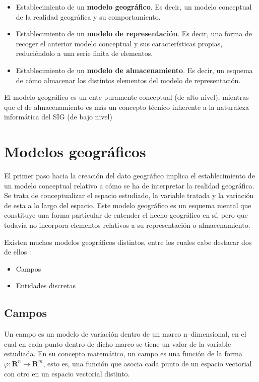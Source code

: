 \begin{multicols}{2}
\begin{itemize}
 \item Establecimiento de un \textbf{modelo geográfico}. Es decir, un modelo conceptual de la realidad geográfica y su comportamiento.
\item Establecimiento de un \textbf{modelo de representación}. Es decir, una forma de recoger el anterior modelo conceptual y sus características propias, reduciéndolo a una serie finita de elementos.
\item Establecimiento de un \textbf{modelo de almacenamiento}. Es decir, un esquema de cómo almacenar los distintos elementos del modelo de representación.
\end{itemize}
El modelo geográfico es un ente puramente conceptual (de alto nivel), mientras que el de almacenamiento es más un concepto técnico inherente a la naturaleza informática del SIG (de bajo nivel)

\section{Modelos geográficos}

El primer paso hacia la creación del dato geográfico implica el establecimiento de un modelo conceptual relativo a cómo se ha de interpretar la realidad geográfica. Se trata de conceptualizar el espacio estudiado, la variable tratada y la variación de esta a lo largo del espacio. Este modelo geográfico es un esquema mental que constituye una forma particular de entender el hecho geográfico en sí, pero que todavía no incorpora elementos relativos a su representación o almacenamiento.

Existen muchos modelos geográficos distintos, entre los cuales cabe destacar dos de ellos \cite{Couclelis1992Springer}:

\begin{itemize}
 \item Campos
\item Entidades discretas
\end{itemize}

\subsection{Campos}

Un campo es un modelo de variación dentro de un marco n--dimensional, en el cual en cada punto dentro de dicho marco se tiene un valor de la variable estudiada. En su concepto matemático, un campo es una función de la forma $\varphi:\mathbf{R}^n\rightarrow \mathbf{R}^m$, esto es, una función que  asocia cada punto de un espacio vectorial con otro en un espacio vectorial distinto.


\end{multicols}
